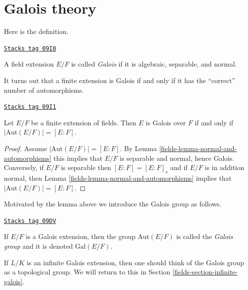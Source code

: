 \section{Galois theory}
\label{fields-section-galois-theory}
Here is the definition.

\begin{definition}[Galois]
\label{fields-definition-galois}
\href{https://stacks.math.columbia.edu/tag/09I0}{\texttt{Stacks tag 09I0}}

A field extension $E/F$ is called {\it Galois} if it is algebraic,
separable, and normal.
\end{definition}

It turns out that a finite extension is Galois if and only if it has
the ``correct'' number of automorphisms.

\begin{lemma}
\label{fields-lemma-finite-Galois}
\href{https://stacks.math.columbia.edu/tag/09I1}{\texttt{Stacks tag 09I1}}

Let $E/F$ be a finite extension of fields. Then $E$ is Galois over $F$
if and only if $|\text{Aut}(E/F)| = [E : F]$.
\end{lemma}

\begin{proof}

Assume $|\text{Aut}(E/F)| = [E : F]$. By
Lemma \ref{fields-lemma-normal-and-automorphisms} this implies
that $E/F$ is separable and normal, hence Galois.
Conversely, if $E/F$ is separable then $[E : F] = [E : F]_s$ and
if $E/F$ is in addition normal, then
Lemma \ref{fields-lemma-normal-and-automorphisms} implies that
$|\text{Aut}(E/F)| = [E : F]$.
\end{proof}

Motivated by the lemma above we introduce the Galois group as follows.

\begin{definition}
\label{fields-definition-galois-group}
\href{https://stacks.math.columbia.edu/tag/09DV}{\texttt{Stacks tag 09DV}}

If $E/F$ is a Galois extension, then the group $\text{Aut}(E/F)$ is
called the {\it Galois group} and it is denoted $\text{Gal}(E/F)$.
\end{definition}

If $L/K$ is an infinite Galois extension, then one should think of the
Galois group as a topological group. We will return to this in
Section \ref{fields-section-infinite-galois}.

